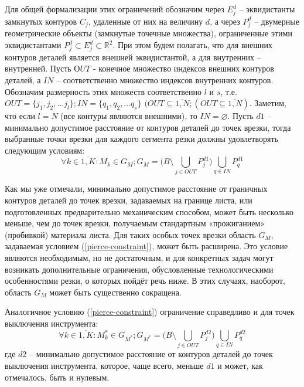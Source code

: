 \documentclass{article}
\begin{document}
Для общей формализации этих ограничений обозначим через
$E_j^d$ – эквидистанты замкнутых контуров $C_j$,
удаленные от них на величину $d$,
а через
$P_j^d$ – двумерные геометрические объекты (замкнутые точечные множества),
ограниченные этими эквидистантами
$P_j^d \subset E_j^d \subset \mathbb R^2$.
При этом будем полагать,
что для внешних контуров деталей  является внешней эквидистантой,
а для внутренних – внутренней.
Пусть $ОUT$ - конечное множество индексов внешних контуров деталей,
а $IN$ – соответственно множество индексов внутренних контуров.
Обозначим  размерность этих множеств соответственно $l$ и $s$,
т.е.
$OUT = \{j_1, j_2, \dots j_l\};
IN = \{q_1, q_2, \dots q_s\}$
$(OUT  \subseteq \overline{1,N};
(OUT  \subseteq \overline{1,N})$.
Заметим, что если $l=N$
(все контуры являются внешними), то
$IN = \varnothing$.
Пусть $d1$ – минимально допустимое расстояние от контуров деталей до точек врезки,
тогда выбранные точки врезки для каждого сегмента резки должны удовлетворять следующим условиям:
\begin{equation}
  \forall k \in \overline{1,K}:
  M_k \in G_M;
  G_M = \big(B \setminus \bigcup_{j\in OUT} P_j^{d1} \big) \bigcup_{q\in IN}P_q^{d1}
  \label{pierce-constraint}
\end{equation}

Как мы уже отмечали,
минимально допустимое расстояние от граничных контуров деталей
до точек врезки,
задаваемых на границе листа,
или подготовленных предварительно механическим способом,
может быть несколько меньше,
чем до точек врезки, получаемым стандартным «прожиганием» (пробивкой) материала листа.
Для таких особых точек врезки область $G_M$,
задаваемая условием (\ref{pierce-constraint}),
может быть расширена.
Это условие являются необходимым, но не достаточным,
и для конкретных задач могут возникать дополнительные ограничения,
обусловленные технологическими особенностями резки,
о которых пойдёт речь ниже.
В этих случаях, наоборот, область $G_M$
может быть существенно сокращена.

Аналогичное условию (\ref{pierce-constraint})
ограничение справедливо и для точек выключения инструмента:
\begin{equation}
  \forall k \in \overline{1,K}:
  M_k^* \in G_{M^*};
  G_{M^*} = \big(B \setminus \bigcup_{j\in OUT} P_j^{d2} \big) \bigcup_{q\in IN}P_q^{d2}
  \label{tool-off-constraint}
\end{equation}
где $d2$ – минимально допустимое расстояние
от контуров деталей до точек выключения инструмента,
которое, чаще всего, меньше $d1$
и может, как отмечалось, быть и нулевым.
\end{document}
